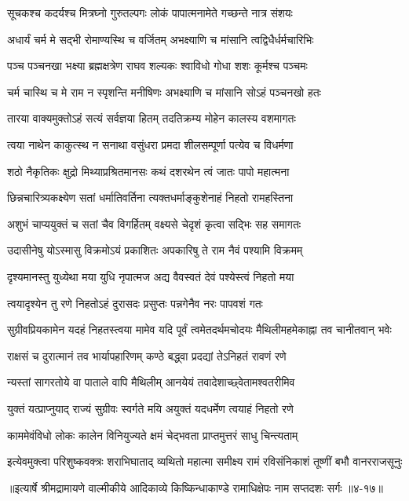 \twolineshloka
{सूचकश्च कदर्यश्च मित्रघ्नो गुरुतल्पगः}
{लोकं पापात्मनामेते गच्छन्ते नात्र संशयः} %

\twolineshloka
{अधार्यं चर्म मे सद्भी रोमाण्यस्थि च वर्जितम्}
{अभक्ष्याणि च मांसानि त्वद्विधैर्धर्मचारिभिः} %

\twolineshloka
{पञ्च पञ्चनखा भक्ष्या ब्रह्मक्षत्रेण राघव}
{शल्यकः श्वाविधो गोधा शशः कूर्मश्च पञ्चमः} %

\twolineshloka
{चर्म चास्थि च मे राम न स्पृशन्ति मनीषिणः}
{अभक्ष्याणि च मांसानि सोऽहं पञ्चनखो हतः} %

\twolineshloka
{तारया वाक्यमुक्तोऽहं सत्यं सर्वज्ञया हितम्}
{तदतिक्रम्य मोहेन कालस्य वशमागतः} %

\twolineshloka
{त्वया नाथेन काकुत्स्थ न सनाथा वसुंधरा}
{प्रमदा शीलसम्पूर्णा पत्येव च विधर्मणा} %

\twolineshloka
{शठो नैकृतिकः क्षुद्रो मिथ्याप्रश्रितमानसः}
{कथं दशरथेन त्वं जातः पापो महात्मना} %

\twolineshloka
{छिन्नचारित्र्यकक्ष्येण सतां धर्मातिवर्तिना}
{त्यक्तधर्माङ्कुशेनाहं निहतो रामहस्तिना} %

\twolineshloka
{अशुभं चाप्ययुक्तं च सतां चैव विगर्हितम्}
{वक्ष्यसे चेदृशं कृत्वा सद्भिः सह समागतः} %

\twolineshloka
{उदासीनेषु योऽस्मासु विक्रमोऽयं प्रकाशितः}
{अपकारिषु ते राम नैवं पश्यामि विक्रमम्} %

\twolineshloka
{दृश्यमानस्तु युध्येथा मया युधि नृपात्मज}
{अद्य वैवस्वतं देवं पश्येस्त्वं निहतो मया} %

\twolineshloka
{त्वयादृश्येन तु रणे निहतोऽहं दुरासदः}
{प्रसुप्तः पन्नगेनैव नरः पापवशं गतः} %

\threelineshloka
{सुग्रीवप्रियकामेन यदहं निहतस्त्वया}
{मामेव यदि पूर्वं त्वमेतदर्थमचोदयः}
{मैथिलीमहमेकाह्ना तव चानीतवान् भवेः} %

\twolineshloka
{राक्षसं च दुरात्मानं तव भार्यापहारिणम्}
{कण्ठे बद्ध्वा प्रदद्यां तेऽनिहतं रावणं रणे} %

\twolineshloka
{न्यस्तां सागरतोये वा पाताले वापि मैथिलीम्}
{आनयेयं तवादेशाच्छ्वेतामश्वतरीमिव} %

\twolineshloka
{युक्तं यत्प्राप्नुयाद् राज्यं सुग्रीवः स्वर्गते मयि}
{अयुक्तं यदधर्मेण त्वयाहं निहतो रणे} %

\twolineshloka
{काममेवंविधो लोकः कालेन विनियुज्यते}
{क्षमं चेद्भवता प्राप्तमुत्तरं साधु चिन्त्यताम्} %

\twolineshloka
{इत्येवमुक्त्वा परिशुष्कवक्त्रः शराभिघाताद् व्यथितो महात्मा}
{समीक्ष्य रामं रविसंनिकाशं तूष्णीं बभौ वानरराजसूनुः} %


॥इत्यार्षे श्रीमद्रामायणे वाल्मीकीये आदिकाव्ये किष्किन्धाकाण्डे रामाधिक्षेपः नाम सप्तदशः सर्गः ॥४-१७॥
